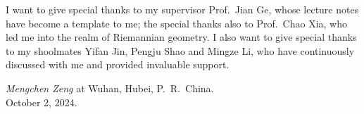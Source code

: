 I want to give special thanks to my supervisor Prof.\ Jian Ge, whose lecture notes have become a template to me;
the special thanks also to Prof.\ Chao Xia, who led me into the realm of Riemannian geometry.
I also want to give special thanks to my shoolmates Yifan Jin, Pengju Shao and Mingze Li, who have continuously discussed with me and provided invaluable support.

\begin{flushright}
    \emph{Mengchen Zeng} at Wuhan, Hubei, P.\ R.\ China.\\
    October 2, 2024.
\end{flushright}